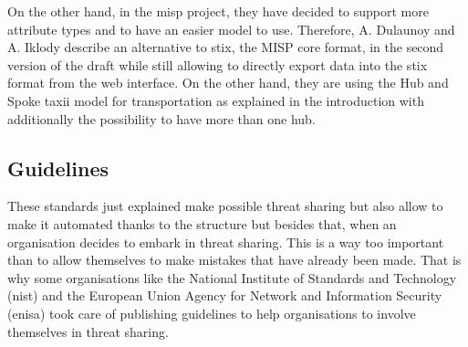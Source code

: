 \documentclass{eplmastersthesis}
\begin{document}
On the other hand, in the \gls{misp} project, they have decided to support more attribute types and to have an easier model to use. Therefore, A. Dulaunoy and A. Iklody describe an alternative to \gls{stix}, the MISP core format, in the second version of the draft\cite{MispDraft} while still allowing to directly export data into the \gls{stix} format from the web interface. On the other hand, they are using the Hub and Spoke \gls{taxii} model for transportation as explained in the introduction with additionally the possibility to have more than one hub.

\subsection{Guidelines}
These standards just explained make possible threat sharing but also allow to make it automated thanks to the structure but besides that, when an organisation decides to embark in threat sharing. This is a way too important than to allow themselves to make mistakes that have already been made. That is why some organisations like the National Institute of Standards and Technology (\gls{nist}) and the European Union Agency for Network and Information Security (\gls{enisa}) took care of publishing guidelines to help organisations to involve themselves in threat sharing.\\
\end{document}
